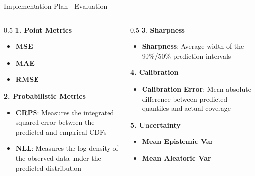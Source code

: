 \documentclass[10pt]{beamer}
\begin{document}
\begin{frame}{Implementation Plan - Evaluation}
\begin{columns}[T]
        \begin{column}{0.5\textwidth}
            \textbf{1. Point Metrics}
            \begin{itemize}
                \item \textbf{MSE}
                \item \textbf{MAE}
                \item \textbf{RMSE}
            \end{itemize}
            
            \textbf{2. Probabilistic Metrics}
            \begin{itemize}
                \item \textbf{CRPS}: Measures the integrated squared error between the predicted and empirical CDFs
                \item \textbf{NLL}: Measures the log-density of the observed data under the predicted distribution
            \end{itemize}
        \end{column}

        \begin{column}{0.5\textwidth}
            \textbf{3. Sharpness}
            \begin{itemize}
                \item \textbf{Sharpness}: Average width of the 90\%/50\% prediction intervals
            \end{itemize}

            \textbf{4. Calibration}
            \begin{itemize}
                \item \textbf{Calibration Error}: Mean absolute difference between predicted quantiles and actual coverage
            \end{itemize}
            

            \textbf{5. Uncertainty}
            \begin{itemize}
                \item \textbf{Mean Epistemic Var}
                \item \textbf{Mean Aleatoric Var}
            \end{itemize}
        \end{column}
    \end{columns}
\end{frame}
\end{document}
